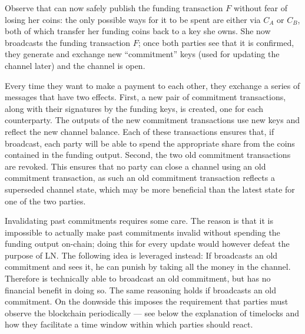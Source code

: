     Observe that \alice{} can now safely publish the funding transaction $F$
    without fear of losing her coins: the only possible ways for it to be spent
    are either via $C_A$ or $C_B$, both of which transfer her funding coins back
    to a key she owns. She now broadcasts the funding transaction $F$; once both
    parties see that it is confirmed, they generate and exchange new
    ``commitment'' keys (used for updating the channel later) and the channel is
    open.

    Every time they want to make a payment to each other, they exchange a series
    of messages that have two effects. First, a new pair of commitment
    transactions, along with their signatures by the funding keys, is created,
    one for each counterparty. The outputs of the new commitment transactions
    use new keys and reflect the new channel balance. Each of these transactions
    ensures that, if
    broadcast, each party will be able to spend the appropriate share from the
    coins contained in the funding output. Second, the two old commitment
    transactions are revoked. This ensures that no party can close a channel
    using an old commitment transaction, as such an old commitment transaction
    reflects a superseded channel state, which may be more beneficial than the
    latest state for one of the two parties.

    Invalidating past commitments requires some care. The reason is that it is
    impossible to actually make past commitments invalid without spending the
    funding output on-chain; doing this for every update would however
    defeat the purpose of LN. The following idea is leveraged instead: If
    \alice{} broadcasts an old commitment and \bob{} sees it, he can punish
    \alice{} by taking all the money in the channel. Therefore \alice{} is
    technically able to broadcast an old commitment, but has no financial
    benefit in doing so. The same reasoning holds if \bob{} broadcasts
    an old commitment. On the donwside this imposes the requirement that
    parties must observe the blockchain periodically --- see below the
    explanation of timelocks and how they facilitate a time window within which
    parties should react.

